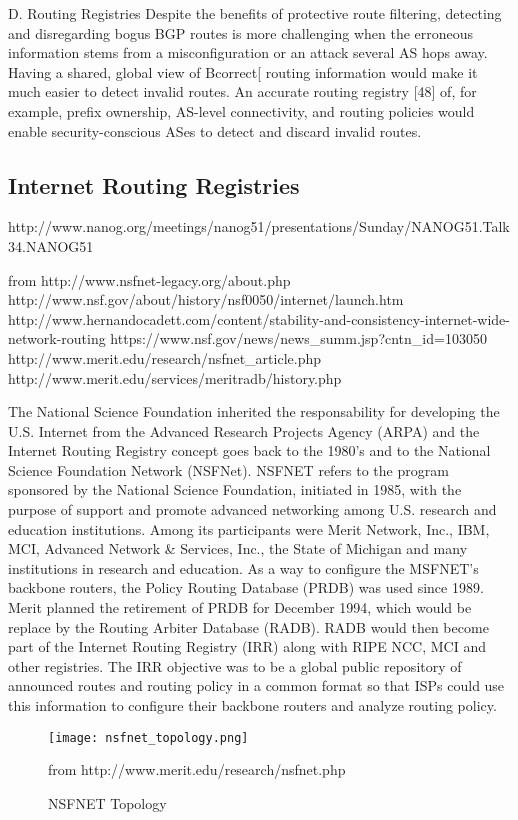 \documentclass[11pt]{report}
\begin{document}
D. Routing Registries
Despite the benefits of protective route filtering,
detecting and disregarding bogus BGP routes is more
challenging when the erroneous information stems from a
misconfiguration or an attack several AS hops away.
Having a shared, global view of Bcorrect[ routing
information would make it much easier to detect invalid
routes. An accurate routing registry [48] of, for example,
prefix ownership, AS-level connectivity, and routing
policies would enable security-conscious ASes to detect
and discard invalid routes. 


\subsection{Internet Routing Registries}
http://www.nanog.org/meetings/nanog51/presentations/Sunday/NANOG51.Talk34.NANOG51%

from http://www.nsfnet-legacy.org/about.php
http://www.nsf.gov/about/history/nsf0050/internet/launch.htm
http://www.hernandocadett.com/content/stability-and-consistency-internet-wide-network-routing
https://www.nsf.gov/news/news\_summ.jsp?cntn\_id=103050
http://www.merit.edu/research/nsfnet\_article.php
http://www.merit.edu/services/meritradb/history.php

The National Science Foundation inherited the responsability for developing the U.S. Internet from the Advanced Research Projects Agency (ARPA) and the Internet Routing Registry concept goes back to the 1980's and to the National Science Foundation Network (NSFNet).  NSFNET refers to the program sponsored by the National Science Foundation, initiated in 1985, with the purpose of support and promote advanced networking among U.S. research and education institutions. Among its participants were Merit Network, Inc., IBM, MCI, Advanced Network \& Services, Inc., the State of Michigan and many institutions in research and education. As a way to configure the MSFNET's backbone routers, the Policy Routing Database (PRDB) was used since 1989. Merit planned the retirement of PRDB for December 1994, which would be replace by the Routing Arbiter Database (RADB). RADB would then become part of the Internet Routing Registry (IRR) along with RIPE NCC, MCI and other registries. The IRR objective was to be a global public repository of announced routes and routing policy in a common format so that ISPs could use this information to configure their backbone routers and analyze routing policy.

\begin{figure}[h!]
\centering
\texttt{[image: nsfnet\_topology.png]}
\caption{NSFNET Topology}
from http://www.merit.edu/research/nsfnet.php
\label{fig:nfsnet_image}
\end{figure}
\end{document}
